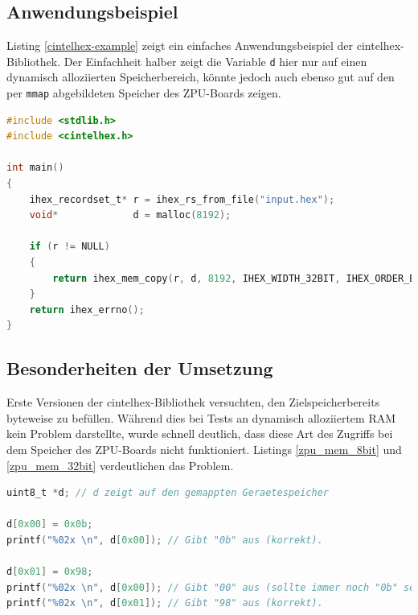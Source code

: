 \documentclass[12pt]{scrartcl}
\begin{document}
\subsection{Anwendungsbeispiel}

Listing \ref{cintelhex-example} zeigt ein einfaches Anwendungsbeispiel der cintelhex-Bibliothek. Der Einfachheit halber zeigt die Variable \texttt{d} hier nur auf einen dynamisch alloziierten Speicherbereich, könnte jedoch auch ebenso gut auf den per \texttt{mmap} abgebildeten Speicher des ZPU-Boards zeigen.

\begin{lstlisting}[language=C,caption=Anwendungsbeispiel der cintelhex-Bibliothek,label=cintelhex-example]
#include <stdlib.h>
#include <cintelhex.h>

int main()
{
	ihex_recordset_t* r = ihex_rs_from_file("input.hex");
	void*             d = malloc(8192);
	
	if (r != NULL)
	{
		return ihex_mem_copy(r, d, 8192, IHEX_WIDTH_32BIT, IHEX_ORDER_BIGENDIAN);
	}
	return ihex_errno();
}
\end{lstlisting}

\subsection{Besonderheiten der Umsetzung}


Erste Versionen der cintelhex-Bibliothek versuchten, den Zielspeicherbereits byteweise zu befüllen. Während dies bei Tests an dynamisch alloziiertem RAM kein Problem darstellte, wurde schnell deutlich, dass diese Art des Zugriffs bei dem Speicher des ZPU-Boards nicht funktioniert. Listings \ref{zpu_mem_8bit} und \ref{zpu_mem_32bit} verdeutlichen das Problem.

\begin{lstlisting}[float=p,language=C,caption=Unerwartetes Verhalten des ZPU-Speichers bei 8-Bit-Zugriff,morekeywords={uint8_t,uint32_t},label=zpu_mem_8bit]
uint8_t *d; // d zeigt auf den gemappten Geraetespeicher

d[0x00] = 0x0b;
printf("%02x \n", d[0x00]); // Gibt "0b" aus (korrekt).

d[0x01] = 0x98;
printf("%02x \n", d[0x00]); // Gibt "00" aus (sollte immer noch "0b" sein)!
printf("%02x \n", d[0x01]); // Gibt "98" aus (korrekt).
\end{lstlisting}
\end{document}
